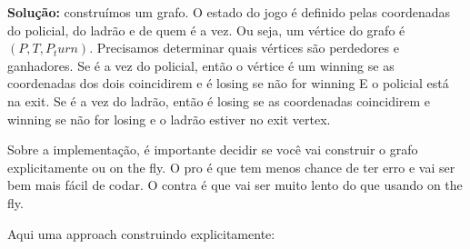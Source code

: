 \textbf{Solução:} construímos um grafo. O estado do jogo é definido pelas coordenadas do policial, do ladrão e de quem é a vez. Ou seja, um vértice do grafo é $(P, T, P_turn)$. Precisamos determinar quais vértices são perdedores e ganhadores. Se é a vez do policial, então o vértice é um winning se as coordenadas dos dois coincidirem e é losing se não for winning E o policial está na exit. Se é a vez do ladrão, então é losing se as coordenadas coincidirem e winning se não for losing e o ladrão estiver no exit vertex.

Sobre a implementação, é importante decidir se você vai construir o grafo explicitamente ou on the fly. O pro é que tem menos chance de ter erro e vai ser bem mais fácil de codar. O contra é que vai ser muito lento do que usando on the fly.

Aqui uma approach construindo explicitamente:

